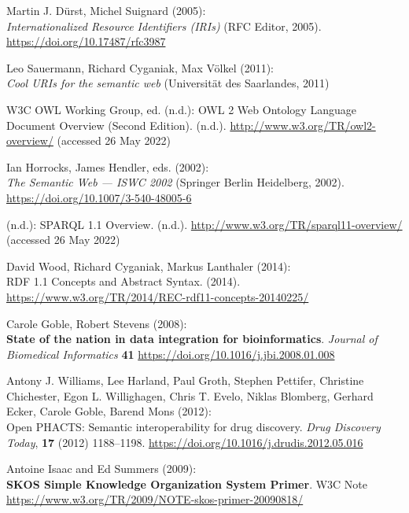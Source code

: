 \begin{thebibliography}{9}
Martin J. Dürst, Michel Suignard (2005): \\
\emph{Internationalized
{Resource Identifiers} ({IRIs})} ({RFC Editor}, 2005).
\url{https://doi.org/10.17487/rfc3987}

Leo Sauermann, Richard Cyganiak, Max Völkel (2011): \\
\emph{Cool {URIs}
for the semantic web} ({Universität des Saarlandes}, 2011)

W3C OWL Working Group, ed. (n.d.): {OWL} 2 {Web Ontology Language
Document Overview} ({Second Edition}). (n.d.).
\url{http://www.w3.org/TR/owl2-overview/} (accessed 26 May 2022)

Ian Horrocks, James Hendler, eds. (2002): \\
\emph{The {Semantic Web} ---
{ISWC} 2002} ({Springer Berlin Heidelberg}, 2002).
\url{https://doi.org/10.1007/3-540-48005-6}

(n.d.): {SPARQL} 1.1 {Overview}. (n.d.).
\url{http://www.w3.org/TR/sparql11-overview/} (accessed 26 May 2022)

David Wood, Richard Cyganiak, Markus Lanthaler (2014): \\
{RDF 1.1
Concepts and Abstract Syntax}. (2014).
\url{https://www.w3.org/TR/2014/REC-rdf11-concepts-20140225/}

Carole Goble, Robert Stevens (2008): \\
\textbf{State of the nation in data integration for bioinformatics}.
\emph{Journal of Biomedical Informatics} \textbf{41}
\url{https://doi.org/10.1016/j.jbi.2008.01.008}

Antony J. Williams, Lee Harland, Paul Groth, Stephen Pettifer, Christine
Chichester, Egon L. Willighagen, Chris T. Evelo, Niklas Blomberg,
Gerhard Ecker, Carole Goble, Barend Mons (2012): \\
Open {PHACTS}:
Semantic interoperability for drug discovery. \emph{Drug Discovery
Today}, \textbf{17} (2012) 1188--1198.
\url{https://doi.org/10.1016/j.drudis.2012.05.016}

Antoine Isaac and Ed Summers (2009): \\
\textbf{SKOS Simple Knowledge Organization System Primer}. 
W3C Note 
\url{https://www.w3.org/TR/2009/NOTE-skos-primer-20090818/}


\end{thebibliography}
